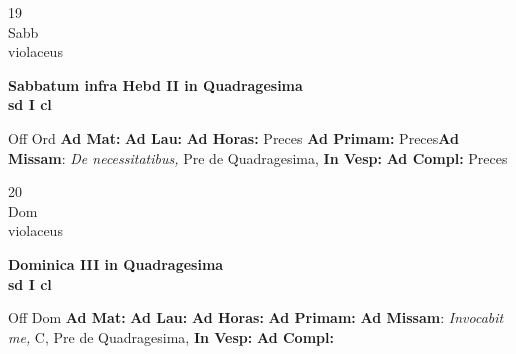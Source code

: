 \documentclass[10pt, openany]{book}
\begin{document}
    \begin{center}
        \begin{minipage}{3.5in}
            \vspace{2em}
            \begin{minipage}{0.5in}
                {\Huge 19} \\
                {\normalsize Sabb} \\
                {\normalsize violaceus}
            \end{minipage}
            \begin{minipage}{3.0in}
                \textbf{ \large Sabbatum infra Hebd II in Quadragesima \\
                \textnormal{\normalsize sd I cl}} \\ 
            \end{minipage}
            \begin{justify}Off Ord
                \textbf{Ad Mat: }
                \textbf{Ad Lau: }
                \textbf{Ad Horas: }Preces
                \textbf{Ad Primam: }Preces\textbf{Ad Missam}: \textit{De necessitatibus,} Pre de Quadragesima,  
                \textbf{In Vesp: }
                \textbf{Ad Compl: }Preces
            \end{justify}
        \end{minipage}
    \end{center}

    \begin{center}
        \begin{minipage}{3.5in}
            \vspace{2em}
            \begin{minipage}{0.5in}
                {\Huge 20} \\
                {\normalsize Dom} \\
                {\normalsize violaceus}
            \end{minipage}
            \begin{minipage}{3.0in}
                \textbf{ \large Dominica III in Quadragesima \\
                \textnormal{\normalsize sd I cl}} \\ 
            \end{minipage}
            \begin{justify}Off Dom
                \textbf{Ad Mat: }
                \textbf{Ad Lau: }
                \textbf{Ad Horas: }
                \textbf{Ad Primam: }\textbf{Ad Missam}: \textit{Invocabit me,} C, Pre de Quadragesima,  
                \textbf{In Vesp: }
                \textbf{Ad Compl: }
            \end{justify}
        \end{minipage}
    \end{center}
\end{document}
